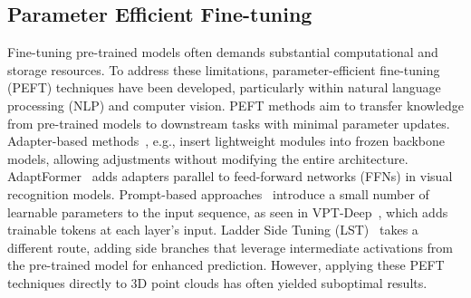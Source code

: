 \subsection{Parameter Efficient Fine-tuning}
Fine-tuning pre-trained models often demands substantial computational and storage resources. To address these limitations, parameter-efficient fine-tuning (PEFT) techniques have been developed, particularly within natural language processing (NLP) and computer vision. PEFT methods aim to transfer knowledge from pre-trained models to downstream tasks with minimal parameter updates. 
Adapter-based methods~\cite{houlsby2019parameter, hu2021lora, chen2022adaptformer}, e.g., insert lightweight modules into frozen backbone models, allowing adjustments without modifying the entire architecture. AdaptFormer~\cite{chen2022adaptformer} adds adapters parallel to feed-forward networks (FFNs) in visual recognition models. 
Prompt-based approaches~\cite{li2021prefix, jia2022visual} introduce a small number of learnable parameters to the input sequence, as seen in VPT-Deep~\cite{jia2022visual}, which adds trainable tokens at each layer’s input. 
Ladder Side Tuning (LST)~\cite{sung2022lst} takes a different route, adding side branches that leverage intermediate activations from the pre-trained model for enhanced prediction. However, applying these PEFT techniques directly to 3D point clouds has often yielded suboptimal results.

